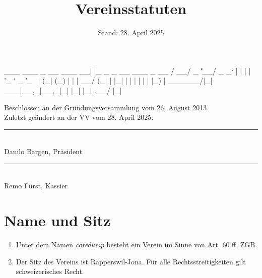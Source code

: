 \documentclass[10pt,a4paper,parskip,fleqn]{scrartcl}
\title{\Huge Vereinsstatuten}
\date{Stand: 28. April 2025}
\newcommand{\ol}{\begin{enumerate}[itemsep=-0.2em,topsep=-0.2em]}
\newcommand{\lo}{\end{enumerate}}
\newcommand{\li}{\item}
\begin{document}
\begin{verbbox}
  ___ ___  _ __ ___  __| |_   _ _ __ ___  _ __  
 / __/ _ \| '__/ _ \/ _` | | | | '_ ` _ \| '_ \ 
| (_| (_) | | |  __/ (_| | |_| | | | | | | |_) |
 \___\___/|_|  \___|\__,_|\__,_|_| |_| |_| .__/ 
                                         |_|    
\end{verbbox}

\begin{titlepage}

	\maketitle
	\thispagestyle{empty} %

  \begin{center}

		\vspace{1cm}

		\theverbbox

		\vfill

		\large Beschlossen an der Gründungsversammlung vom 26. August 2013.\\
		\vspace{1em}
		\large Zuletzt geändert an der VV vom 28. April 2025.

		\vspace{1.5cm}

		\begin{minipage}[t]{0.49\textwidth}
			\center
			\rule{5cm}{0.2mm}\\
			Danilo Bargen, Präsident
		\end{minipage}
		\begin{minipage}[t]{0.49\textwidth}
			\center
			\rule{5cm}{0.2mm}\\
			Remo Fürst, Kassier
		\end{minipage}

  \end{center}

\end{titlepage}


\section{Name und Sitz}

\ol
	\li Unter dem Namen \textit{coredump} besteht ein Verein im Sinne von Art. 60
	ff. ZGB.
	\li Der Sitz des Vereins ist Rapperswil-Jona. Für alle Rechtsstreitigkeiten
	gilt schweizerisches Recht.
\lo
\end{document}
